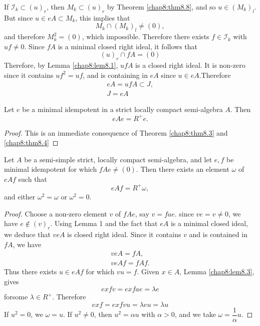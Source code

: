 If $\mathscr{I}_k \subset (u)_r$, then $M_k \subset (u)_r$ by Theorem
\ref{chap8:thm8.8}, and so $u \in (M_k)_l$. But since $u \in eA
\subset M_k$, this implies that 
$$
M_k \cap (M_k)_l \neq (0),
$$
and therefore $M^2_k=(0)$, which impossible. Therefore there exists $f
\in \mathscr{I}_k$ with $uf \neq 0$. Since $fA$ is a minimal closed
right ideal, it follows that 
$$
(u)_r \cap fA=(0)
$$
Therefore, by Lemma \ref{chap8:lem8.1}, $ufA$ is a closed right
ideal. It is non-zero 
since it contains $uf^2=uf$, and is containing in $eA$ since $u \in
eA$.\pageoriginale Therefore 
\begin{gather*}
  eA=ufA \subset J,\\
  J=eA
\end{gather*}

\begin{lemma}\label{chap8:lem8.3} %
  Let $e$ be a minimal idempotent in a strict locally compact
  semi-algebra $A$. Then 
  $$
  eAe = R^+ e.
  $$
\end{lemma}

\begin{proof}
  This is an immediate consequence of Theorem \ref{chap8:thm8.3}
 and \ref{chap8:thm8.4} 
\end{proof}

\begin{lemma}\label{chap8:lem8.4} %
  Let $A$ be a semi-simple strict, locally compact semi-algebra, and
  let $e,f$ be minimal idempotent for which $f A e \neq (0)$. Then
  there exists an element $\omega$ of $eAf$ such that 
  $$
  eAf=R^+ \omega,
  $$
  and either $\omega^2=\omega$ or $\omega^2=0$.
\end{lemma}

\begin{proof}
  Choose a non-zero element $v$ of $fAe$, say $v=fae$. since $ve=v
  \neq 0$, we have $e \notin (v)_r$. Using Lemma 1 and the fact that
  $eA$ is a minimal closed ideal, we deduce that $veA$ is closed right
  ideal. Since it contains $v$ and is contained in $fA$, we have 
  \begin{gather*}
    veA = fA,\\
    veAf=fAf.
  \end{gather*}
  Thus there exists $u \in e A f$ for which $vu=f$. Given $x \in A$,
  Lemma \ref{chap8:lem8.3}, gives 
  $$
  exfv=exfae=\lambda e
  $$
  for\pageoriginale some $\lambda \in R^+$. Therefore
  $$
  exf=exfvu= \lambda eu=\lambda u
  $$
  If $u^2=0$, we $\omega=u$. If $u^2 \neq 0$, then $u^2 =\alpha u$
  with $\alpha >0$, and we take $\omega=\dfrac{1}{\alpha}u$. 
\end{proof}

